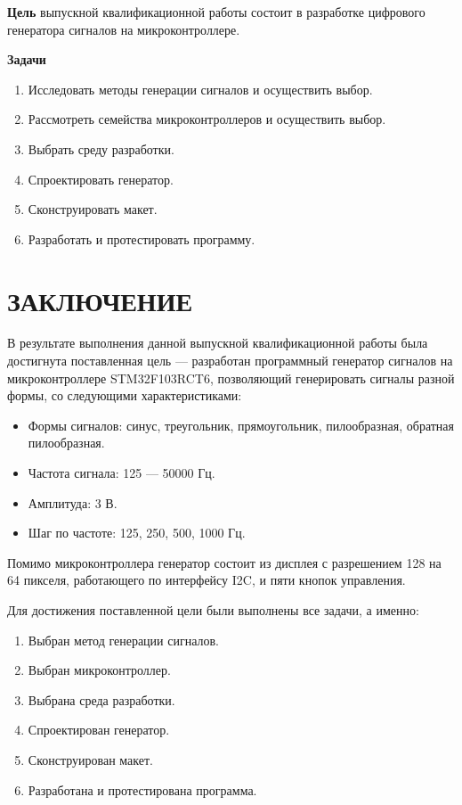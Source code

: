 \documentclass[14pt, oneside]{altsu-bachelor}
\begin{document}
\textbf{Цель}
	выпускной квалификационной работы состоит в разработке цифрового генератора сигналов на микроконтроллере.

\textbf{Задачи}

	\begin{enumerate}
		\item Исследовать методы генерации сигналов и осуществить выбор.
		\item Рассмотреть семейства микроконтроллеров и осуществить выбор.
		\item Выбрать среду разработки.
		\item Спроектировать генератор.
		\item Сконструировать макет.
		\item Разработать и протестировать программу.
	\end{enumerate}





\chapter*{ЗАКЛЮЧЕНИЕ}
	В результате выполнения данной выпускной квалификационной работы была достигнута поставленная цель --- разработан программный генератор сигналов на микроконтроллере STM32F103RCT6, позволяющий генерировать сигналы разной формы, со следующими характеристиками:

	\begin{itemize}
		\item Формы сигналов: синус, треугольник, прямоугольник, пилообразная, обратная пилообразная.
		\item Частота сигнала: 125 --- 50000 Гц.
		\item Амплитуда: 3 В.
		\item Шаг по частоте: 125, 250, 500, 1000 Гц.
	\end{itemize}

	Помимо микроконтроллера генератор состоит из дисплея с разрешением 128 на 64 пикселя, работающего по интерфейсу I2C, и пяти кнопок управления.

	Для достижения поставленной цели были выполнены все задачи, а именно:
	\begin{enumerate}
		\item Выбран метод генерации сигналов.
		\item Выбран микроконтроллер.
		\item Выбрана среда разработки.
		\item Спроектирован генератор.
		\item Сконструирован макет.
		\item Разработана и протестирована программа.
	\end{enumerate}
\end{document}
